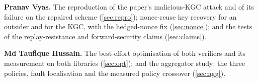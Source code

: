\smallskip\noindent\textbf{Pranav Vyas.} The reproduction of the paper's malicious-KGC attack and of its
failure on the repaired scheme (\cref{sec:repro}); nonce-reuse key recovery for an outsider and for the
KGC, with the hedged-nonce fix (\cref{sec:nonce}); and the tests of the replay-resistance and
forward-security claims (\cref{sec:claims}).

\smallskip\noindent\textbf{Md Taufique Hussain.} The best-effort optimisation of both verifiers and its
measurement on both libraries (\cref{sec:opt}); and the aggregator study: the three policies, fault
localisation and the measured policy crossover (\cref{sec:agg}).
